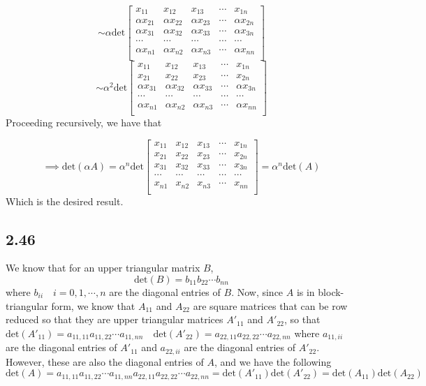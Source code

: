 \documentclass[letterpaper,12pt]{article}
\theoremstyle{definition}
\begin{document}
\[
\sim
\alpha \text{det}
\begin{bmatrix}
     x_{11} & x_{12} &x_{13} & \cdots &x_{1n} \\
   \alpha x_{21} &\alpha x_{22} &\alpha x_{23} & \cdots &\alpha x_{2n} \\
   \alpha x_{31} &\alpha x_{32} &\alpha x_{33} & \cdots &\alpha x_{3n} \\
    \cdots&\cdots&\cdots &\cdots &\cdots\\
   \alpha x_{n1} &\alpha x_{n2} &\alpha x_{n3} & \cdots &\alpha x_{nn} \\
\end{bmatrix}
\]
\[
\sim
\alpha^2 \text{det}
\begin{bmatrix}
     x_{11} & x_{12} &x_{13} & \cdots &x_{1n} \\
    x_{21} &x_{22} & x_{23} & \cdots &x_{2n} \\
   \alpha x_{31} &\alpha x_{32} &\alpha x_{33} & \cdots &\alpha x_{3n} \\
    \cdots&\cdots&\cdots &\cdots &\cdots\\
   \alpha x_{n1} &\alpha x_{n2} &\alpha x_{n3} & \cdots &\alpha x_{nn} \\
\end{bmatrix}
\]
Proceeding recursively, we have that

\[\implies \text{det}(\alpha A)  = 
\alpha^n \text{det}
\begin{bmatrix}
    x_{11} & x_{12} & x_{13} & \cdots & x_{1n} \\
    x_{21} & x_{22} & x_{23} & \cdots & x_{2n} \\
    x_{31} & x_{32} & x_{33} & \cdots & x_{3n} \\
    \cdots&\cdots&\cdots &\cdots &\cdots\\
    x_{n1} & x_{n2} & x_{n3} & \cdots & x_{nn} \\
\end{bmatrix}
=
\alpha^n \text{det}(A)
\]
Which is the desired result.

\subsection*{2.46}
We know that for an upper triangular matrix $B$,
\[\text{det}(B) = b_{11}b_{22}\cdots b_{nn}\] where $b_{ii} \quad i = 0,1,\cdots,n$ are the diagonal entries of $B$. Now, since $A$ is in block-triangular form, we know that $A_{11}$ and $A_{22}$ are square matrices that can be row reduced so that they are upper triangular matrices $A'_{11}$ and $A'_{22}$, so that $\text{det}(A'_{11}) = a_{11,11}a_{11,22}\cdots a_{11,nn} \quad \text{det}(A'_{22}) = a_{22,11}a_{22,22}\cdots a_{22,nn}$ where $a_{11,ii}$ are the diagonal entries of $A'_{11}$ and  $a_{22,ii}$ are the diagonal entries of $A'_{22}$. However, these are also the diagonal entries of $A$, and we have the following
\[\text{det}(A) = a_{11,11}a_{11,22}\cdots a_{11,nn}a_{22,11}a_{22,22}\cdots a_{22,nn} = \text{det}(A'_{11})\text{det}(A'_{22})= \text{det}(A_{11})\text{det}(A_{22})\]
\end{document}
